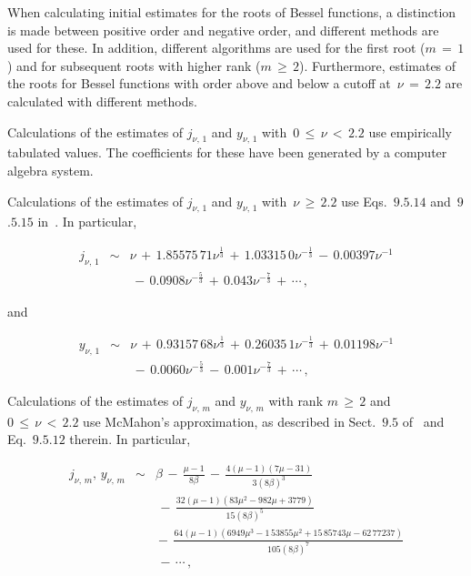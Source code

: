 \documentclass{article}[10pt]
\begin{document}
When calculating initial estimates for the roots
of Bessel functions, a distinction is made between
positive order and negative order, and different
methods are used for these. In addition, different algorithms
are used for the first root ($m\,=\,1$) and
for subsequent roots with higher rank ($m\,\ge\,2$).
Furthermore, estimates of the roots for Bessel functions
with order above and below a cutoff at~$\nu\,=\,2.2$
are calculated with different methods.

Calculations of the estimates of $j_{\nu,\,1}$ and $y_{\nu,\,1}$
with~$0\,\le\,\nu\,<\,2.2$ use empirically tabulated values.
The coefficients for these have been generated by a
computer algebra system.

Calculations of the estimates of $j_{\nu,\,1}$ and $y_{\nu,\,1}$
with~$\nu\,\ge\,2.2$ use
Eqs.~$9$.$5$.$14$ and~$9$.$5$.$15$
in~\cite{bibitem:abramowitz}.
In particular,

\begin{eqnarray}
j_{\nu,\,1}
& \sim &
\nu
\,+\,
1.85575\,71\nu^{\frac{1}{3}}
\,+\,
1.03315\,0\nu^{-\frac{1}{3}}
\,-\,
0.00397\nu^{-1}
\nonumber \\
&&
\,-\,
0.0908\nu^{-\frac{5}{3}}
\,+\,
0.043\nu^{-\frac{7}{3}}
\,+\,\cdots
\,{\text{,}}
\end{eqnarray}

\noindent
and

\begin{eqnarray}
y_{\nu,\,1}
& \sim &
\nu
\,+\,
0.93157\,68\nu^{\frac{1}{3}}
\,+\,
0.26035\,1\nu^{-\frac{1}{3}}
\,+\,
0.01198\nu^{-1}
\nonumber \\
&&
\,-\,
0.0060\nu^{-\frac{5}{3}}
\,-\,
0.001\nu^{-\frac{7}{3}}
\,+\,\cdots
\,{\text{,}}
\end{eqnarray}

Calculations of the estimates of $j_{\nu,\,m}$ and $y_{\nu,\,m}$
with rank $m\,\ge\,2$ and~$0\,\le\,\nu\,<\,2.2$ use
McMahon's approximation, as described in Sect.~$9$.$5$
of~\cite{bibitem:abramowitz} and Eq.~$9$.$5$.$12$ therein.
In particular,

\begin{eqnarray}
j_{\nu,\,m},\,y_{\nu,\,m}
& \sim &
\beta
\,-\,
\frac{\mu - 1}{8\beta}
\,-\,
\frac{4(\mu - 1)(7\mu -31)}{3(8\beta)^3}
\nonumber \\
&&
\,-\,
\frac{32(\mu - 1)(83\mu^2 - 982\mu +3779)}{15(8\beta)^5}
\nonumber \\
&&
\!\!\!\! - \,
\frac{64(\mu - 1)(6949\mu^3 - 1\,53855\mu^2 + 15\,85743\mu - 62\,77237)}{105(8\beta)^7}
\nonumber \\
&&
\,-\,\cdots
\,{\text{,}}
\label{equation:mcmahon}
\end{eqnarray}
\end{document}

